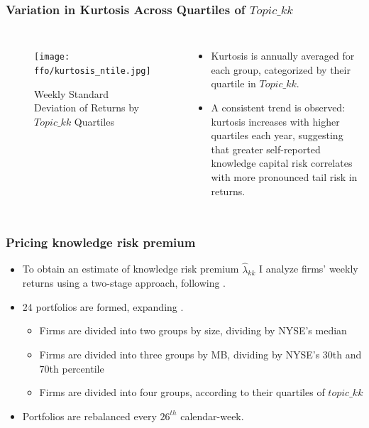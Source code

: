 \documentclass{beamer}
\newcommand{\ffo}{dicfullmc10thr10defnob40noa1_4t}
\newcommand{\insertfigure}[2]{
\begin{figure}[h!]
  \centering
  \texttt{[image: \\ffo/\#1]}
  \centering
  \captionsetup{font=scriptsize}
  \caption{#2}
  \label{fig:#1}
\end{figure}
}
\begin{document}
\begin{frame}
\frametitle{Variation in Kurtosis Across Quartiles of $Topic\_{kk}$}
\scriptsize 
\begin{columns}
\begin{figure}[h!]
\centering
\texttt{[image: \\ffo/kurtosis\_ntile.jpg]}
\caption{Weekly Standard Deviation of Returns by $Topic\_{kk}$ Quartiles}
\label{fig:kurtosis_ntile}
\end{figure}

\scriptsize 
\begin{itemize}
	\item Kurtosis is annually averaged for each group, categorized by their quartile in $Topic\_{kk}$.
	\item A consistent trend is observed: kurtosis increases with higher quartiles each year, suggesting that greater self-reported knowledge capital risk correlates with more pronounced tail risk in returns.
\end{itemize}
\end{columns}
\end{frame}




\begin{frame}
\small 
\frametitle{Pricing knowledge risk premium}
\begin{itemize}
\item To obtain an estimate of knowledge risk premium $\widehat{\lambda}_{kk}$ I analyze firms' weekly returns using a two-stage approach, following \cite{Goyal2012-ct}. 

\item 24 portfolios are formed, expanding \cite{Fama1993-da}. 
\begin{itemize}
	\item Firms are divided into two groups by size, dividing by NYSE's median
	\item Firms are divided into three groups by MB, dividing by NYSE's 30th and 70th percentile
	\item Firms are divided into four groups, according to their quartiles of $topic\_kk$  
\end{itemize}

\item Portfolios are rebalanced every $26^{th}$ calendar-week.
\end{itemize}
\end{frame}
\end{document}
